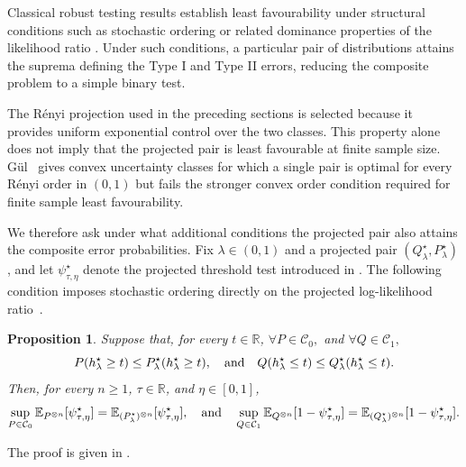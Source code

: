 \documentclass[journal,10pt,draftclsnofoot,onecolumn]{IEEEtran}
\newtheorem{proposition}{Proposition}
\begin{document}
Classical robust testing results establish least favourability under structural conditions such as stochastic ordering or related dominance properties of the likelihood ratio \cite{huber1965robust,verdu2003minimax,fauss2021minimax}. Under such conditions, a particular pair of distributions attains the suprema defining the Type I and Type II errors, reducing the composite problem to a simple binary test.
 
The R\'enyi projection used in the preceding sections is selected because it provides uniform exponential control over the two classes. This property alone does not imply that the projected pair is least favourable at finite sample size. G\"ul~\cite{gul2026structural} gives convex uncertainty classes for which a single pair is optimal for every R\'enyi order in $(0,1)$ but fails the stronger convex order condition required for finite sample least favourability.
 
We therefore ask under what additional conditions the projected pair also attains the composite error probabilities. Fix $\lambda\in(0,1)$ and a projected pair $(Q_\lambda^\star,P_\lambda^\star)$, and let $\psi_{\tau,\eta}^\star$ denote the projected threshold test introduced in . The following condition imposes stochastic ordering directly on the projected log-likelihood ratio~.

\begin{proposition} 
\label{prop:projected-ordering} 
Suppose that, for every $t\in\mathbb R$, $\forall P\in\mathcal C_0,$ and $ \forall Q\in\mathcal C_1,$ 
\begin{equation*} P(h_\lambda^\star\geq t) \leq P_\lambda^\star(h_\lambda^\star\geq t), \quad {\rm and} \quad Q(h_\lambda^\star\leq t) \leq Q_\lambda^\star(h_\lambda^\star\leq t). \end{equation*} 
Then, for every $n\geq1$, $\tau\in\mathbb R$, and $\eta\in[0,1]$, 
\begin{equation*} \sup_{P\in\mathcal C_0} \mathbb E_{P^{\otimes n}}[\psi_{\tau,\eta}^\star] = \mathbb E_{(P_\lambda^\star)^{\otimes n}} [\psi_{\tau,\eta}^\star], \quad {\rm and} \quad \sup_{Q\in\mathcal C_1} \mathbb E_{Q^{\otimes n}}[1-\psi_{\tau,\eta}^\star] = \mathbb E_{(Q_\lambda^\star)^{\otimes n}} [1-\psi_{\tau,\eta}^\star]. 
\end{equation*} 
\end{proposition}
The proof is given in .
 
\end{document}
